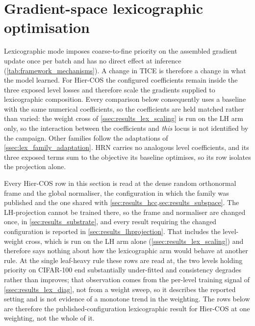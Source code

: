 \FloatBarrier

\section{Gradient-space lexicographic optimisation}
\label{sec:results_lex}

Lexicographic mode imposes coarse-to-fine priority on the assembled gradient
update once per batch and has no direct effect at inference
(\cref{tab:framework_mechanisms}). A change in TICE is therefore a change
in what the model learned. For Hier-COS the configured coefficients remain
inside the three exposed level losses and therefore scale the gradients supplied
to lexicographic composition. Every comparison below consequently uses a
baseline with the same numerical coefficients, so the coefficients are held
matched rather than varied: the weight cross of \cref{ssec:results_lex_scaling}
is run on the LH arm only, so the interaction between the coefficients and
\emph{this} locus is not identified by the campaign. Other families
follow the adaptations of \cref{ssec:lex_family_adaptation}. HRN carries no
analogous level coefficients, and its three exposed terms sum to the objective
its baseline optimises, so its row isolates the projection alone.

Every Hier-COS row in this section is read at the dense random orthonormal frame
and the global normaliser, the configuration in which the family was published
and the one shared with \cref{sec:results_hcc,sec:results_subspace}. The
LH-projection cannot be trained there, so the frame and normaliser are changed
once, in \cref{sec:results_substrate}, and every result requiring the changed
configuration is reported in \cref{sec:results_lhprojection}. That includes the
level-weight cross, which is run on the LH arm alone
(\cref{ssec:results_lex_scaling}) and therefore says nothing about how the
lexicographic arm would behave at another rule. At the single leaf-heavy rule
these rows are read at, the two levels holding priority on CIFAR-100 end
substantially under-fitted and consistency degrades rather than improves; that
observation comes from the per-level training signal of
\cref{ssec:results_lex_diag}, not from a weight sweep, so it describes the
reported setting and is not evidence of a monotone trend in the weighting. The
rows below are therefore the published-configuration lexicographic result for
Hier-COS at one weighting, not the whole of it.

